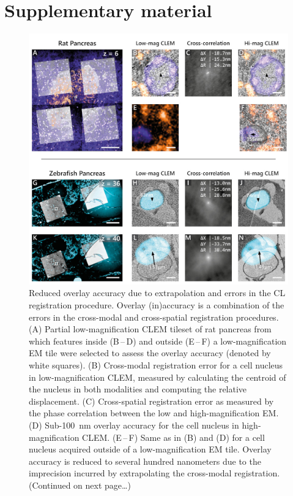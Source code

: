 \clearpage
\section{Supplementary material}
\label{sec:3_supplement}
\renewcommand{\thefigure}{3.S\arabic{figure}}
\setcounter{figure}{0}


\begin{figure}[!tbh]
    \centering
    \includegraphics[width=\linewidth]{chapter-3/figures_JPEG_LQ/fig3-S1_misalignment.jpg}
    \caption{Reduced overlay accuracy due to extrapolation and errors in the CL registration procedure. Overlay (in)accuracy is a combination of the errors in the cross-modal and cross-spatial registration procedures.
    (A) Partial low-magnification CLEM tileset of rat pancreas from which features inside (B\,--\,D) and outside (E\,--\,F) a low-magnification EM tile were selected to assess the overlay accuracy (denoted by white squares).
    (B) Cross-modal registration error for a cell nucleus in low-magnification CLEM, measured by calculating the centroid of the nucleus in both modalities and computing the relative displacement.
    (C) Cross-spatial registration error as measured by the phase correlation between the low and high-magnification EM.
    (D) Sub-\SI{100}{\nano\meter} overlay accuracy for the cell nucleus in high-magnification CLEM.
    (E\,--\,F) Same as in (B) and (D) for a cell nucleus acquired outside of a low-magnification EM tile. Overlay accuracy is reduced to several hundred nanometers due to the imprecision incurred by extrapolating the cross-modal registration.
    (Continued on next page\ldots)}
    \label{fig:3.S1_misalignment}
\end{figure}
